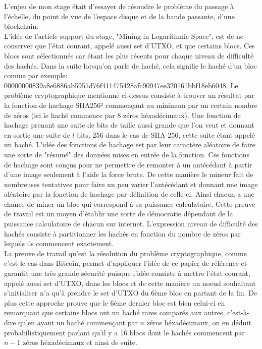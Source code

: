 \documentclass[12pt,a4paper]{article}
\newcommand{\source}[1]{\hyperlink{#1}{[#1]}}
\begin{document}
	L'enjeu de mon stage était d'essayer de résoudre le problème du passage à l'échelle, du point de vue de l'espace disque et de la bande passante, d'une blockchain.\\
	L'idée de l'article support du stage, "Mining in Logarithmic Space", est de ne conserver que l'état courant, appelé aussi set d'UTXO, et que certains blocs. Ces blocs sont sélectionnés car étant les plus récents pour chaque niveau de difficulté des hachés. Dans la suite lorsqu'on parle de haché, cela signifie le haché d'un bloc comme par exemple:\\ 00000000839a8e6886ab5951d76f411475428afc90947ee320161bbf18eb6048. Le problème cryptographique mentionné ci-dessus consiste à trouver un résultat par la fonction de hachage SHA256² commençant au minimum par un certain nombre de zéros (ici le haché commence par 8 zéros héxadécimaux). Une fonction de hachage prenant une suite de bits de taille aussi grande que l'on veut et donnant en sortie une suite de $l$ bits, 256 dans le cas de SHA-256, cette suite étant appelé un haché. L'idée des fonctions de hachage est par leur caractère aléatoire de faire une sorte de "résumé" des données mises en entrée de la fonction. Ces fonctions de hachage sont conçus pour ne permettre de remonter à un antécédant à partir d'une image seulement à l'aide la force brute. De cette manière le mineur fait de nombreuses tentatives pour faire un peu varier l'antécédant et donnant une image aléatoire par la fonction de hachage par définition de celle-ci. Ainsi chacun a une chance de miner un bloc qui correspond à sa puissance calculatoire. Cette preuve de travail est un moyen d'établir une sorte de démocratie dépendant de la puissance calculatoire de chacun sur internet. L'expression niveau de difficulté des hachés consiste à partitionner les hachés en fonction du nombre de zéros par lequels ils commencent exactement.\\ %
	La preuve de travail qu'est la résolution du problème cryptographique, comme c'est le cas dans Bitcoin, permet d'appliquer l'idée de ce papier de référence et garantit une très grande sécurité puisque l'idée consiste à mettre l'état courant, appelé aussi set d'UTXO, dans les blocs et de cette manière un noeud souhaitant s'initialiser n'a qu'à prendre le set d'UTXO du 6ème bloc en partant de la fin. De plus cette approche prouve que le 6ème dernier bloc est bien celui-ci en remarquant que certains blocs ont un haché rares comparés aux autres, c'est-à-dire qu'en ayant un haché commençant par $n$ zéros héxadécimaux, on en déduit probabilistiquement parlant qu'il y a 16 blocs dont le hachés commencent par $n - 1$ zéros héxadécimaux et ainsi de suite.%
	
\end{document}
